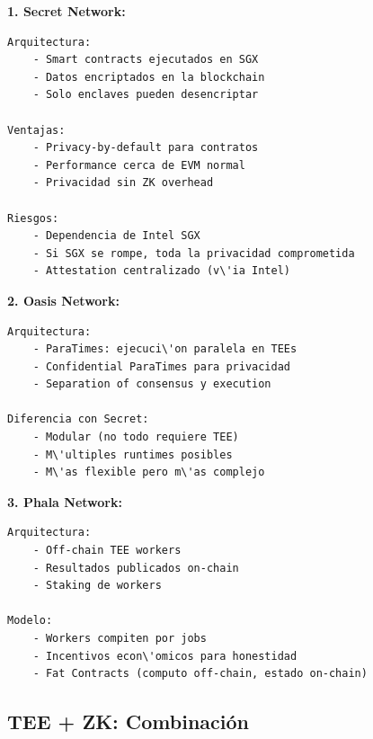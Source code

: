\documentclass[11pt,a4paper,twoside]{book}
\begin{document}
\begin{example}
\textbf{1. Secret Network:}
\begin{verbatim}
Arquitectura:
    - Smart contracts ejecutados en SGX
    - Datos encriptados en la blockchain
    - Solo enclaves pueden desencriptar
    
Ventajas:
    - Privacy-by-default para contratos
    - Performance cerca de EVM normal
    - Privacidad sin ZK overhead
    
Riesgos:
    - Dependencia de Intel SGX
    - Si SGX se rompe, toda la privacidad comprometida
    - Attestation centralizado (v\'ia Intel)
\end{verbatim}

\textbf{2. Oasis Network:}
\begin{verbatim}
Arquitectura:
    - ParaTimes: ejecuci\'on paralela en TEEs
    - Confidential ParaTimes para privacidad
    - Separation of consensus y execution
    
Diferencia con Secret:
    - Modular (no todo requiere TEE)
    - M\'ultiples runtimes posibles
    - M\'as flexible pero m\'as complejo
\end{verbatim}

\textbf{3. Phala Network:}
\begin{verbatim}
Arquitectura:
    - Off-chain TEE workers
    - Resultados publicados on-chain
    - Staking de workers
    
Modelo:
    - Workers compiten por jobs
    - Incentivos econ\'omicos para honestidad
    - Fat Contracts (computo off-chain, estado on-chain)
\end{verbatim}
\end{example}

\subsection{TEE + ZK: Combinaci\'on}
\end{document}
